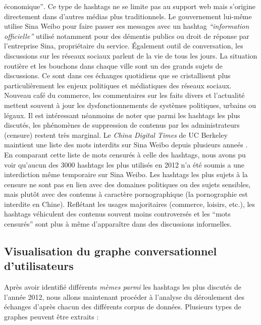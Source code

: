 \'economique{\textquotedblright}\textit{. }Ce type de hashtags ne se
limite pas au support web mais s{\textquoteright}origine directement
dans d{\textquoteright}autres m\'edias plus traditionnels. Le
gouvernement lui-m\^eme utilise Sina Weibo pour faire passer ses
messages avec un hashtag \textit{{\textquotedblleft}information
officielle{\textquotedblright} }utilis\'e notamment pour des d\'ementis
publics ou droit de r\'eponse par l{\textquoteright}entreprise Sina,
propri\'etaire du service. \'Egalement outil de conversation, les
discussions sur les r\'eseaux sociaux parlent de la vie de tous les
jours. La situation routi\`ere et les bouchons dans chaque ville sont
un des grands sujets de discussions. Ce sont dans ces \'echanges
quotidiens que se cristallisent plus particuli\`erement les enjeux
politiques et m\'ediatiques des r\'eseaux sociaux. Nouveau caf\'e du
commerce, les commentaires sur les faits divers et
l{\textquoteright}actualit\'e mettent souvent \`a jour les
dysfonctionnements de syst\`emes politiques, urbains ou l\'egaux. Il
est int\'eressant n\'eanmoins de noter que parmi les hashtags les plus
discut\'es, les ph\'enom\`enes de suppression de contenus par les
administrateurs (censure) restent tr\`es marginal. Le \textit{China
Digital Times} de UC Berkeley maintient une liste des mots interdits
sur Sina Weibo depuis plusieurs anne\'es \cite{Ng2013}. En comparant cette
liste de mots censur\'es \`a celle des hashtags, nous avons pu voir
qu{\textquoteright}aucun des 3000 hashtags les plus utilis\'es en 2012
n{\textquoteright}a \'et\'e soumis a une interdiction m\^eme temporaire
sur Sina Weibo. Les hashtags les plus sujets \`a la censure ne sont pas
en lien avec des domaines politiques ou des sujets sensibles, mais
plut\^ot avec des contenus \`a caract\`ere pornographique (la
pornographie est interdite en Chine). Refl\'etant les usages
majoritaires (commerce, loisirs, etc.), les hashtags v\'ehiculent des
contenus souvent moins controvers\'es et les {\textquotedblleft}mots
censur\'es{\textquotedblright} sont plus \`a m\^eme
d{\textquoteright}appara\^itre dans des discussions informelles.

\subsection[Visualisation du graphe conversationnel d{\textquoteright}utilisateurs]{Visualisation du graphe conversationnel d{\textquoteright}utilisateurs}
Apr\`es avoir identifi\'e diff\'erents \textit{m\`emes parmi }les
hashtags les plus discut\'es de l{\textquoteright}ann\'ee 2012, nous
allons maintenant proc\'eder \`a l{\textquoteright}analyse du
d\'eroulement des \'echanges d{\textquoteright}apr\`es chacun des
diff\'erents corpus de donn\'ees. Plusieurs types de graphes peuvent
\^etre extraits :



